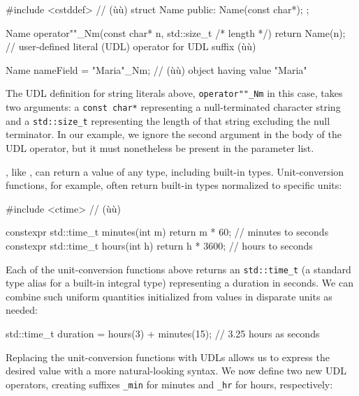 \begin{emcppshiddenlisting}[emcppsbatch=e3]
#include <cstddef>  // (ù{}ù)
struct Name
{
public:
    Name(const char*);
};
\end{emcppshiddenlisting}
\begin{emcppslisting}[emcppsbatch=e3]
Name operator""_Nm(const char* n, std::size_t /* length */) { return Name(n); }
    // user-defined literal (UDL) operator for UDL suffix (ù{}ù)

Name nameField = "Maria"_Nm;  // (ù{}ù) object having value "Maria"
\end{emcppslisting}

\noindent The UDL definition for string literals above, \lstinline!operator""_Nm! in
this case, takes two arguments: a \lstinline!const!~\lstinline!char*!
representing a null-terminated character string and a
\lstinline!std::size_t! representing the length of that string excluding
the null terminator. In our example, we ignore the second argument in
the body of the UDL operator, but it must nonetheless be present in the
parameter list.

, like , can return a
value of any type, including built-in types. Unit-conversion functions,
for example, often return built-in types normalized to specific units:

\begin{emcppslisting}[emcppsbatch={e4,e5}]
#include <ctime>  // (ù{}ù)

constexpr std::time_t minutes(int m) { return m * 60; }    // minutes to seconds
constexpr std::time_t hours(int h)   { return h * 3600; }  // hours to seconds
\end{emcppslisting}

\noindent Each of the unit-conversion functions above returns an
\lstinline!std::time_t! (a standard type alias for a built-in integral
type) representing a duration in seconds. We can combine such uniform
quantities initialized from values in disparate units as needed:

\begin{emcppslisting}[emcppsbatch=e4]
std::time_t duration = hours(3) + minutes(15);   // 3.25 hours as seconds
\end{emcppslisting}

\noindent Replacing the unit-conversion functions with UDLs allows us to express
the desired value with a more natural-looking syntax. We now define two
new UDL operators, creating suffixes \lstinline!_min! for minutes and
\lstinline!_hr! for hours, respectively:

